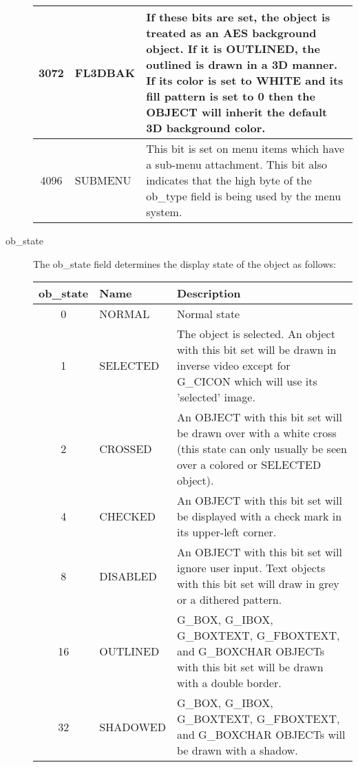 \begin{description}
\begin{center}
\begin{longtable}{|clp{10cm}|}
3072 & FL3DBAK & If these bits are set, the object is treated as an AES background object.  
                 If it is OUTLINED, the outlined is drawn in a 3D manner. If its color
                 is set to WHITE and its fill pattern is set to 0 then the OBJECT will inherit 
                 the default 3D background color.\\\hline
4096 & SUBMENU & This bit is set on menu items which have a sub-menu attachment. This bit also
                 indicates that the high byte of the ob\_type field is being used by the menu
                 system.\\\hline
\end{longtable}\end{center}

\item[ob\_state] The ob\_state field determines the display state of the object as
follows:

\begin{center}\begin{longtable}{|clp{10cm}|}
\hline
{\bf ob\_state} & {\bf Name} & {\bf Description}\\
\hline
0 & NORMAL   & Normal state \\\hline
1 & SELECTED & The object is selected. An object with this bit set will be drawn in inverse
               video except for G\_CICON which will use its 'selected' image.\\\hline
2 & CROSSED  & An OBJECT with this bit set will be drawn over with a white cross (this   
               state can only usually be seen over a colored or	SELECTED object).\\\hline
4 & CHECKED  & An OBJECT with this bit set will be displayed with a check mark in its    
               upper-left corner.\\\hline
8 & DISABLED & An OBJECT with this bit set will ignore user input. Text objects with this   
               bit set will draw in grey or a dithered pattern.\\\hline
16 & OUTLINED & G\_BOX, G\_IBOX, G\_BOXTEXT, G\_FBOXTEXT, and G\_BOXCHAR OBJECTs   
               with this bit set will be drawn with a double border.\\\hline
32 & SHADOWED & G\_BOX, G\_IBOX, G\_BOXTEXT, G\_FBOXTEXT, and G\_BOXCHAR OBJECTs   
                will be drawn with a shadow.\\\hline
\end{longtable}\end{center}


\end{description}
